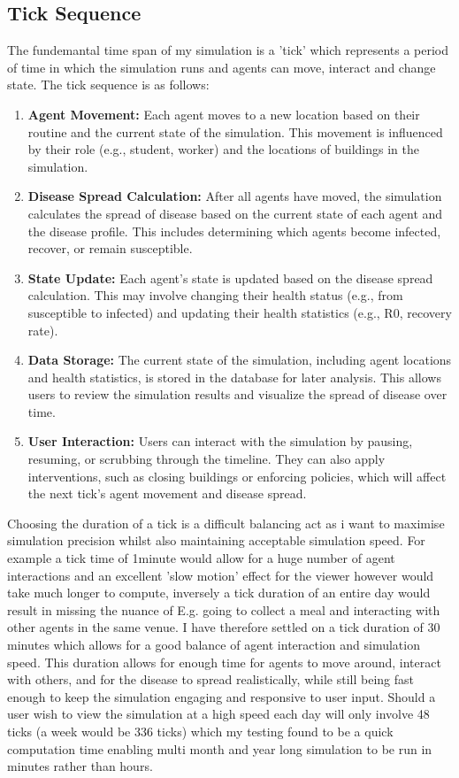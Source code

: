 \subsection{Tick Sequence}
The fundemantal time span of my simulation is a 'tick' which represents a period of time in which the simulation runs and agents can move, interact and change state. The tick sequence is as follows:
\begin{enumerate}
    \item \textbf{Agent Movement:} Each agent moves to a new location based on their routine and the current state of the simulation. This movement is influenced by their role (e.g., student, worker) and the locations of buildings in the simulation.
    \item \textbf{Disease Spread Calculation:} After all agents have moved, the simulation calculates the spread of disease based on the current state of each agent and the disease profile. This includes determining which agents become infected, recover, or remain susceptible.
    \item \textbf{State Update:} Each agent's state is updated based on the disease spread calculation. This may involve changing their health status (e.g., from susceptible to infected) and updating their health statistics (e.g., R0, recovery rate).
    \item \textbf{Data Storage:} The current state of the simulation, including agent locations and health statistics, is stored in the database for later analysis. This allows users to review the simulation results and visualize the spread of disease over time.
    \item \textbf{User Interaction:} Users can interact with the simulation by pausing, resuming, or scrubbing through the timeline. They can also apply interventions, such as closing buildings or enforcing policies, which will affect the next tick's agent movement and disease spread.
\end{enumerate}

Choosing the duration of a tick is a difficult balancing act as i want to maximise simulation precision whilst also maintaining acceptable simulation speed. For example a tick time of 1minute would allow for a huge number of agent interactions and an excellent 'slow motion' effect for the viewer however would take much longer to compute, inversely a tick duration of an entire day would result in missing the nuance of E.g. going to collect a meal and interacting with other agents in the same venue. I have therefore settled on a tick duration of 30 minutes which allows for a good balance of agent interaction and simulation speed. This duration allows for enough time for agents to move around, interact with others, and for the disease to spread realistically, while still being fast enough to keep the simulation engaging and responsive to user input. Should a user wish to view the simulation at a high speed each day will only involve 48 ticks (a week would be 336 ticks) which my testing found to be a quick computation time enabling multi month and year long simulation to be run in minutes rather than hours.


